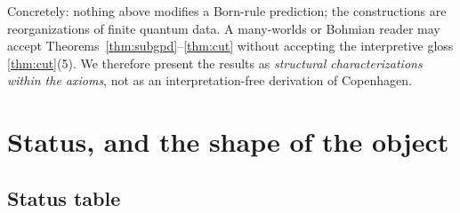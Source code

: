 \documentclass[11pt]{article}
\theoremstyle{definition}
\theoremstyle{remark}
\begin{document}
Concretely: nothing above modifies a Born-rule prediction; the constructions are
reorganizations of finite quantum data. A many-worlds or Bohmian reader may accept
Theorems~\ref{thm:subgpd}--\ref{thm:cut} without accepting the interpretive gloss
\ref{thm:cut}(5). We therefore present the results as \emph{structural
characterizations within the axioms}, not as an interpretation-free derivation of
Copenhagen.

\section{Status, and the shape of the object}\label{sec:status}

\subsection*{Status table}
\end{document}

